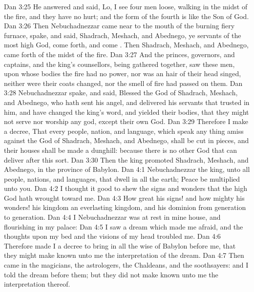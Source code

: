 \vs Dan 3:25 He answered and said, Lo, I see four men loose, walking in the midst of the fire, and they have no hurt; and the form of the fourth is like the Son of God.
\vs Dan 3:26 Then Nebuchadnezzar came near to the mouth of the burning fiery furnace,  spake, and said, Shadrach, Meshach, and Abednego, ye servants of the most high God, come forth, and come . Then Shadrach, Meshach, and Abednego, came forth of the midst of the fire.
\vs Dan 3:27 And the princes, governors, and captains, and the king's counsellors, being gathered together, saw these men, upon whose bodies the fire had no power, nor was an hair of their head singed, neither were their coats changed, nor the smell of fire had passed on them.
\vs Dan 3:28  Nebuchadnezzar spake, and said, Blessed  the God of Shadrach, Meshach, and Abednego, who hath sent his angel, and delivered his servants that trusted in him, and have changed the king's word, and yielded their bodies, that they might not serve nor worship any god, except their own God.
\vs Dan 3:29 Therefore I make a decree, That every people, nation, and language, which speak any thing amiss against the God of Shadrach, Meshach, and Abednego, shall be cut in pieces, and their houses shall be made a dunghill: because there is no other God that can deliver after this sort.
\vs Dan 3:30 Then the king promoted Shadrach, Meshach, and Abednego, in the province of Babylon.
\vs Dan 4:1 Nebuchadnezzar the king, unto all people, nations, and languages, that dwell in all the earth; Peace be multiplied unto you.
\vs Dan 4:2 I thought it good to shew the signs and wonders that the high God hath wrought toward me.
\vs Dan 4:3 How great  his signs! and how mighty  his wonders! his kingdom  an everlasting kingdom, and his dominion  from generation to generation.
\vs Dan 4:4 I Nebuchadnezzar was at rest in mine house, and flourishing in my palace:
\vs Dan 4:5 I saw a dream which made me afraid, and the thoughts upon my bed and the visions of my head troubled me.
\vs Dan 4:6 Therefore made I a decree to bring in all the wise  of Babylon before me, that they might make known unto me the interpretation of the dream.
\vs Dan 4:7 Then came in the magicians, the astrologers, the Chaldeans, and the soothsayers: and I told the dream before them; but they did not make known unto me the interpretation thereof.
